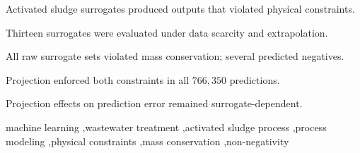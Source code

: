 \documentclass[a4paper,fleqn]{cas-sc}
\begin{document}
\begin{highlights}
\item Activated sludge surrogates produced outputs that violated physical constraints.
\item Thirteen surrogates were evaluated under data scarcity and extrapolation.
\item All raw surrogate sets violated mass conservation; several predicted negatives.
\item Projection enforced both constraints in all $766{,}350$ predictions.
\item Projection effects on prediction error remained surrogate-dependent.
\end{highlights}

\begin{keywords}
machine learning \sep wastewater treatment \sep activated sludge process \sep process modeling \sep physical constraints \sep mass conservation \sep non-negativity
\end{keywords}

\maketitle
\end{document}
